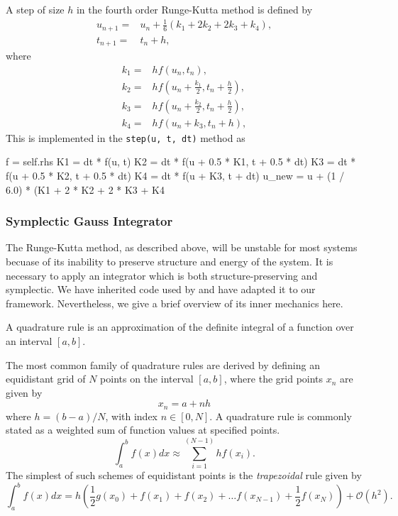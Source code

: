     A step of size $h$ in the fourth order Runge-Kutta method is defined by 
    \begin{equation}
       \begin{aligned}
            u_{n+1} =& u_n + \frac{1}{6}(k_1 + 2k_2 + 2k_3 + k_4), \\
            t_{n+1} =& t_n + h,
       \end{aligned} 
    \end{equation} 
    where
    \begin{align*}
        k_1 =& hf(u_n, t_n), \\
        k_2 =& hf(u_n + \frac{k_1}{2}, t_n + \frac{h}{2}), \\
        k_3 =& hf(u_n + \frac{k_2}{2}, t_n + \frac{h}{2}), \\
        k_4 =& hf(u_n + k_3, t_n + h),
    \end{align*}
    This is implemented in the \lstinline{step(u, t, dt)} method as
    \begin{python}
    f = self.rhs
    K1 = dt * f(u, t)
    K2 = dt * f(u + 0.5 * K1, t + 0.5 * dt)
    K3 = dt * f(u + 0.5 * K2, t + 0.5 * dt)
    K4 = dt * f(u + K3, t + dt)
    u_new = u + (1 / 6.0) * (K1 + 2 * K2 + 2 * K3 + K4 
    \end{python}

    \subsubsection{Symplectic Gauss Integrator}

    The Runge-Kutta method, as described above, will be unstable for most systems
    becuase of its inability to preserve structure and energy of the system. It is 
    necessary to apply an integrator which is both structure-preserving and 
    symplectic.
    We have inherited code used by 
    \citeauthor{pedersen2019symplectic}\cite{pedersen2019symplectic} and have 
    adapted it to our framework. Nevertheless, we give a brief overview of 
    its inner mechanics here.

    A quadrature rule is an approximation of the definite integral of a function over 
    an interval $[a,b]$.

    The most common family of quadrature rules are derived by 
    defining an equidistant grid of $N$ points on the interval $[a,b]$,
    where the grid points $x_n$ are given by 
    \begin{equation}
        x_n = a + nh
    \end{equation}
    where $h = (b - a)/N$, with index $n\in[0, N]$. A quadrature rule is commonly stated 
    as a weighted sum of function values at specified points. 
    \begin{equation*}
        \int_a^b f(x) dx \approx \sum_{i=1}^{(N-1)} h f(x_i).
    \end{equation*}
    The simplest of such schemes of equidistant points is the \emph{trapezoidal} rule 
    given by 
    \begin{equation}
        \int_a^b f(x) dx = 
            h \left(\frac{1}{2}g(x_0) + f(x_1) + f(x_2) + \dots 
                f(x_{N-1}) + \frac{1}{2}f(x_N) \right) + \mathscr{O}(h^2).
    \end{equation}

